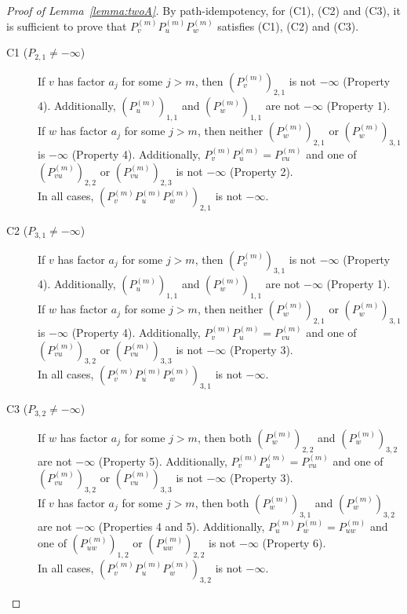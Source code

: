 \documentclass{lmcs}
\theoremstyle{remark}
\theoremstyle{remark}
\begin{document}
    

\begin{proof}[Proof of Lemma~\ref{lemma:twoA}]
By path-idempotency, for (C1), (C2) and (C3), it is sufficient to prove that $P^{(m)}_v P^{(m)}_u P^{(m)}_w$ satisfies (C1), (C2) and (C3). 
\begin{description}
    
\item[C1 ($P_{2,1} \neq -\infty$)]  If $v$ has factor $a_j$ for some $j>m$, then $(P^{(m)}_v)_{2,1}$ is not $-\infty$ (Property 4). Additionally, $(P^{(m)}_u)_{1,1}$ and $(P^{(m)}_w)_{1,1}$ are not $-\infty$ (Property 1). \\
If $w$ has factor $a_j$ for some $j>m$, then neither $(P^{(m)}_w)_{2,1}$ or $(P^{(m)}_w)_{3,1}$ is $-\infty$ (Property 4). Additionally, $P^{(m)}_v P^{(m)}_u = P^{(m)}_{vu}$ and one of $(P^{(m)}_{vu})_{2,2}$ or $(P^{(m)}_{vu})_{2,3}$ is not $-\infty$ (Property 2). \\
In all cases, $(P^{(m)}_v P^{(m)}_u P^{(m)}_w)_{2,1}$ is not $-\infty$.

\item[C2 ($P_{3,1} \neq -\infty$)]  If $v$ has factor $a_j$ for some $j>m$, then $(P^{(m)}_v)_{3,1}$ is not $-\infty$ (Property 4). Additionally, $(P^{(m)}_u)_{1,1}$ and $(P^{(m)}_w)_{1,1}$ are not $-\infty$ (Property 1). \\
If $w$ has factor $a_j$ for some $j>m$, then neither $(P^{(m)}_w)_{2,1}$ or $(P^{(m)}_w)_{3,1}$ is $-\infty$ (Property 4). Additionally, $P^{(m)}_v P^{(m)}_u = P^{(m)}_{vu}$ and one of $(P^{(m)}_{vu})_{3,2}$ or $(P^{(m)}_{vu})_{3,3}$ is not $-\infty$ (Property 3).\\ 
In all cases, $(P^{(m)}_v P^{(m)}_u P^{(m)}_w)_{3,1}$ is not $-\infty$.

\item[C3 ($P_{3,2} \neq -\infty$)] If $w$ has factor $a_j$ for some $j>m$, then both $(P^{(m)}_w)_{2,2}$ and $(P^{(m)}_w)_{3,2}$ are not $-\infty$ (Property 5). Additionally, $P^{(m)}_v P^{(m)}_u = P^{(m)}_{vu}$ and one of $(P^{(m)}_{vu})_{3,2}$ or $(P^{(m)}_{vu})_{3,3}$ is not $-\infty$ (Property 3). \\
If $v$ has factor $a_j$ for some $j>m$, then both $(P^{(m)}_w)_{3,1}$ and $(P^{(m)}_w)_{3,2}$ are not $-\infty$ (Properties 4 and 5). Additionally, $P^{(m)}_u P^{(m)}_w = P^{(m)}_{uw}$ and one of $(P^{(m)}_{uw})_{1,2}$ or $(P^{(m)}_{uw})_{2,2}$ is not $-\infty$ (Property 6). \\
In all cases, $(P^{(m)}_v P^{(m)}_u P^{(m)}_w)_{3,2}$ is not $-\infty$.


\end{description}
\end{proof}
\end{document}
